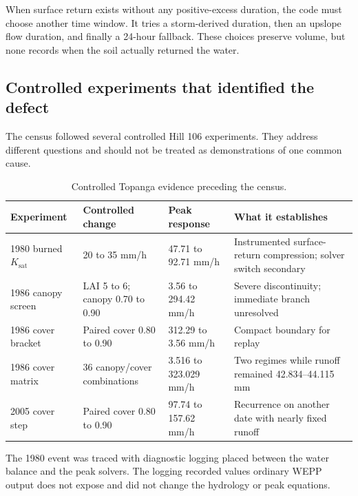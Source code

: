 \documentclass[11pt]{article}
\newcommand{\Ksat}{\ensuremath{K_{\mathrm{sat}}}}
\begin{document}
When surface return exists without any positive-excess duration, the code must
choose another time window. It tries a storm-derived duration, then an upslope
flow duration, and finally a 24-hour fallback. These choices preserve volume,
but none records when the soil actually returned the water.

\subsection{Controlled experiments that identified the defect}

The census followed several controlled Hill 106 experiments. They address
different questions and should not be treated as demonstrations of one common
cause.

\begin{table}[H]
  \centering
  \small
  \caption{Controlled Topanga evidence preceding the census.}
  \label{tab:controlled-evidence}
  \begin{tabular}{p{}p{}p{}p{}}
    \toprule
    Experiment & Controlled change & Peak response & What it establishes \\
    \midrule
    1980 burned \Ksat{} & 20 to 35 mm/h & 47.71 to 92.71 mm/h & Instrumented surface-return compression; solver switch secondary \\
    1986 canopy screen & LAI 5 to 6; canopy 0.70 to 0.90 & 3.56 to 294.42 mm/h & Severe discontinuity; immediate branch unresolved \\
    1986 cover bracket & Paired cover 0.80 to 0.90 & 312.29 to 3.56 mm/h & Compact boundary for replay \\
    1986 cover matrix & 36 canopy/cover combinations & 3.516 to 323.029 mm/h & Two regimes while runoff remained 42.834--44.115 mm \\
    2005 cover step & Paired cover 0.80 to 0.90 & 97.74 to 157.62 mm/h & Recurrence on another date with nearly fixed runoff \\
    \bottomrule
  \end{tabular}
\end{table}

The 1980 event was traced with diagnostic logging placed between the water
balance and the peak solvers. The logging recorded values ordinary WEPP output
does not expose and did not change the hydrology or peak equations.
\end{document}
